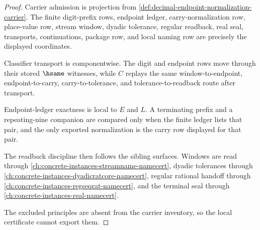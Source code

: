 \begin{proof}
Carrier admission is projection from \autoref{def:decimal-endpoint-normalization-carrier}. The finite digit-prefix rows, endpoint ledger, carry-normalization row, place-value row, stream window, dyadic tolerance, regular readback, real seal, transports, continuations, package row, and local naming row are precisely the displayed coordinates.

Classifier transport is componentwise. The digit and endpoint rows move through their stored $\hsame$ witnesses, while $C$ replays the same window-to-endpoint, endpoint-to-carry, carry-to-tolerance, and tolerance-to-readback route after transport.

Endpoint-ledger exactness is local to $E$ and $L$. A terminating prefix and a repeating-nine companion are compared only when the finite ledger lists that pair, and the only exported normalization is the carry row displayed for that pair.

The readback discipline then follows the sibling surfaces. Windows are read through \autoref{ch:concrete-instances-streamname-namecert}, dyadic tolerances through \autoref{ch:concrete-instances-dyadicratcore-namecert}, regular rational handoff through \autoref{ch:concrete-instances-regseqrat-namecert}, and the terminal seal through \autoref{ch:concrete-instances-real-namecert}.

The excluded principles are absent from the carrier inventory, so the local certificate cannot export them.
\end{proof}

